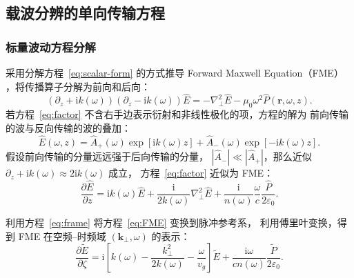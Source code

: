 \documentclass[a4paper,12pt]{ctexart}
\numberwithin{equation}{section}
\newcommand{\vect}[1]{\bm{#1}}
\begin{document}
\subsection{载波分辨的单向传输方程}

\subsubsection{标量波动方程分解}
\label{sec:factor-method}
采用分解方程~\eqref{eq:scalar-form} 的方式推导 Forward Maxwell Equation（FME）
\cite{Feit:88}，将传播算子分解为前向和后向：
\begin{equation}
  (\partial_z+\mathrm{i}k(\omega))(\partial_z-\mathrm{i}k(\omega))\hat{E}
  =-\nabla_\perp^2\hat{E}-\mu_0\omega^2\hat{P}(\vect{r},\omega,z).
  \label{eq:factor}
\end{equation}
若方程~\eqref{eq:factor} 不含右手边表示衍射和非线性极化的项，方程的解为
前向传输的波与反向传输的波的叠加：
\begin{equation}
  \hat{E}(\omega,z)=\hat{A}_+(\omega)\exp[\mathrm{i}k(\omega)z]
  +\hat{A}_-(\omega)\exp[-\mathrm{i}k(\omega)z].
\end{equation}
假设前向传输的分量远远强于后向传输的分量，
$|\hat{A}_-|\ll|\hat{A}_+|$，那么近似
$\partial_z+\mathrm{i}k(\omega)\approx2\mathrm{i}k(\omega)$ 成立，
方程~\eqref{eq:factor} 近似为 FME：
\begin{equation}
  \frac{\partial\hat{E}}{\partial z}
  =\mathrm{i}k(\omega)\hat{E}
  +\frac{\mathrm{i}}{2k(\omega)}\nabla_\perp^2\hat{E}
  +\frac{\mathrm{i}}{n(\omega)}\frac{\omega}{c}
  \frac{\hat{P}}{2\varepsilon_0}.
  \label{eq:FME}
\end{equation}

利用方程~\eqref{eq:frame} 将方程~\eqref{eq:FME} 变换到脉冲参考系，
利用傅里叶变换，得到 FME 在空频--时频域 $(\vect{k}_\perp,\omega)$ 的表示：
\begin{equation}
  \frac{\partial\tilde{E}}{\partial\zeta}
  =\mathrm{i}\left[k(\omega)-\frac{k_\perp^2}{2k(\omega)}
    -\frac{\omega}{v_g}\right]\tilde{E}
  +\frac{\mathrm{i}\omega}{cn(\omega)}\frac{\tilde{P}}{2\varepsilon_0}.
  \label{eq:FME-local}
\end{equation}
\end{document}
